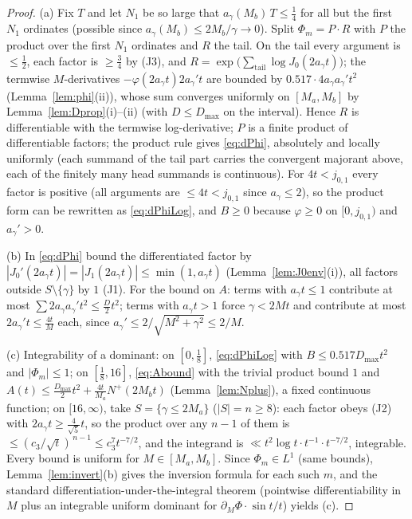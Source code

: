 \begin{proof}
(a) Fix $T$ and let $N_1$ be so large that
$a_\gamma(M_b)\,T\le\tfrac14$ for all but the first $N_1$ ordinates
(possible since $a_\gamma(M_b)\le2M_b/\gamma\to0$). Split
$\Phi_m=P\cdot R$ with $P$ the product over the first $N_1$ ordinates
and $R$ the tail. On the tail every argument is $\le\tfrac12$, each
factor is $\ge\tfrac34$ by (J3), and
$R=\exp\bigl(\sum_{\mathrm{tail}}\log J_0(2a_\gamma t)\bigr)$; the
termwise $M$-derivatives $-\varphi(2a_\gamma t)2a_\gamma't$ are
bounded by $0.517\cdot4a_\gamma a_\gamma't^2$
(Lemma~\ref{lem:phi}(ii)), whose sum converges uniformly on
$[M_a,M_b]$ by Lemma~\ref{lem:Dprop}(i)--(ii) (with $D\le D_{\max}$
on the interval). Hence $R$ is differentiable with the termwise
log-derivative; $P$ is a finite product of differentiable factors;
the product rule gives \eqref{eq:dPhi}, absolutely and locally
uniformly (each summand of the tail part carries the convergent
majorant above, each of the finitely many head summands is
continuous). For $4t<j_{0,1}$ every factor is positive
(all arguments are $\le4t<j_{0,1}$ since $a_\gamma\le2$), so the
product form can be rewritten as \eqref{eq:dPhiLog}, and $B\ge0$
because $\varphi\ge0$ on $[0,j_{0,1})$ and $a_\gamma'>0$.

(b) In \eqref{eq:dPhi} bound the differentiated factor by
$|J_0'(2a_\gamma t)|=|J_1(2a_\gamma t)|\le\min(1,a_\gamma t)$
(Lemma~\ref{lem:J0env}(i)), all factors outside $S\setminus\{\gamma\}$
by $1$ (J1). For the bound on $A$: terms with $a_\gamma t\le1$
contribute at most $\sum2a_\gamma a_\gamma't^2\le\tfrac D2t^2$; terms
with $a_\gamma t>1$ force $\gamma<2Mt$ and contribute at most
$2a_\gamma't\le\tfrac{4t}M$ each, since $a_\gamma'\le
2/\sqrt{M^2+\gamma^2}\le2/M$.

(c) Integrability of a dominant: on $[0,\tfrac18]$,
\eqref{eq:dPhiLog} with $B\le0.517D_{\max}t^2$ and
$|\Phi_m|\le1$; on $[\tfrac18,16]$, \eqref{eq:Abound} with the
trivial product bound $1$ and
$A(t)\le\tfrac{D_{\max}}2t^2+\tfrac{4t}{M_a}N^+(2M_bt)$
(Lemma~\ref{lem:Nplus}), a fixed continuous function; on
$[16,\infty)$, take $S=\{\gamma\le2M_a\}$ ($|S|=n\ge8$): each factor
obeys (J2) with $2a_\gamma t\ge\tfrac4{\sqrt5}t$, so the product over
any $n-1$ of them is $\le(c_3/\sqrt t)^{\,n-1}\le c_3^{7}t^{-7/2}$,
and the integrand is $\ll t^{2}\log t\cdot t^{-1}\cdot t^{-7/2}$,
integrable. Every bound is uniform for $M\in[M_a,M_b]$. Since
$\Phi_m\in L^1$ (same bounds), Lemma~\ref{lem:invert}(b) gives the
inversion formula for each such $m$, and the standard
differentiation-under-the-integral theorem (pointwise
differentiability in $M$ plus an integrable uniform dominant for
$\partial_M\Phi\cdot\sin t/t$) yields (c).
\end{proof}

